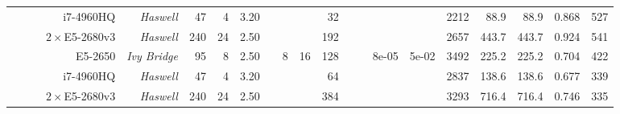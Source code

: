 \begin{table}
\begin{adjustbox}{angle=90}
{{\begin{tabular}{|r|r|r||r|r|r|r|r|r|r|r|r|r|r||r|r|r|r||r|r|r|}
                                                                 &                                       &                       & i7-4960HQ                & \textit{Haswell}                 & 47                   & 4                  & 3.20                   &                          &                     &                     & 32                  &                       &                    &                               &                          &   2212        &   88.9           &   88.9         & 0.868         &    527             \\ \cline{4-8} \cline{12-12} \cline{17-21}
                                                                 &                                       &                       & $2\times$E5-2680v3       & \textit{Haswell}                 & 240                  & 24                 & 2.50                   &                          &                     &                     & 192                 &                       &                    &                               &                          &   2657        &  443.7           &  443.7         & 0.924         &    541             \\ \cline{4-8} \cline{10-12} \cline{15-21}
                                                                 &                                       &                       & E5-2650                  & \textit{Ivy Bridge}              & 95                   & 8                  & 2.50                   &                          & \multirow{3}{*}{8}  & \multirow{3}{*}{16} & 128                 &                       &                    & \multirow{3}{*}{8e-05}        & \multirow{3}{*}{5e-02}   &   3492        &  225.2           &  225.2         & 0.704         &    422             \\ \cline{4-8} \cline{12-12} \cline{17-21}
                                                                 &                                       &                       & i7-4960HQ                & \textit{Haswell}                 & 47                   & 4                  & 3.20                   &                          &                     &                     & 64                  &                       &                    &                               &                          &   2837        &  138.6           &  138.6         & 0.677         &    339             \\ \cline{4-8} \cline{12-12} \cline{17-21}
                                                                 &                                       &                       & $2\times$E5-2680v3       & \textit{Haswell}                 & 240                  & 24                 & 2.50                   &                          &                     &                     & 384                 &                       &                    &                               &                          &   3293        &  716.4           &  716.4         & 0.746         &    335             \\ \cline{2-21}

\end{tabular}}}
\end{adjustbox}
\end{table}
